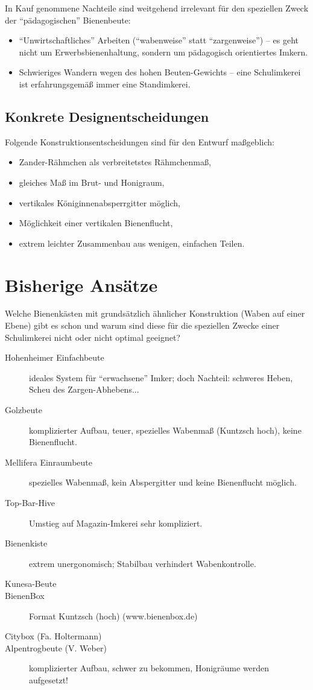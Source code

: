 \documentclass[12pt,a4paper,ngerman]{scrartcl}
\begin{document}
In Kauf genommene Nachteile sind weitgehend irrelevant für den speziellen Zweck der \enquote{pädagogischen} Bienenbeute:

\begin{itemize}
\item \enquote{Unwirtschaftliches} Arbeiten (\enquote{wabenweise} statt \enquote{zargenweise}) -- es geht nicht um Erwerbsbienenhaltung,
  sondern um pädagogisch orientiertes Imkern.
\item Schwieriges Wandern wegen des hohen Beuten-Gewichts -- eine Schulimkerei ist erfahrungsgemäß immer eine Standimkerei.
\end{itemize}


\subsection{Konkrete Designentscheidungen}

Folgende Konstruktionsentscheidungen sind für den Entwurf maßgeblich:

\begin{itemize}
\item Zander-Rähmchen als verbreitetstes Rähmchenmaß,
\item gleiches Maß im Brut- und Honigraum,
\item vertikales Königinnenabsperrgitter möglich,
\item Möglichkeit einer vertikalen Bienenflucht,
\item extrem leichter Zusammenbau aus wenigen, einfachen Teilen.
\end{itemize}


\section{Bisherige Ansätze}

Welche Bienenkästen mit grundsätzlich ähnlicher Konstruktion (Waben auf einer Ebene) gibt es schon und warum sind diese
für die speziellen Zwecke einer Schulimkerei nicht oder nicht optimal geeignet?

\begin{description}
\item[Hohenheimer Einfachbeute] ideales System für \enquote{erwachsene} Imker; doch Nachteil: schweres Heben, Scheu des Zargen-Abhebens...
\item[Golzbeute] komplizierter Aufbau, teuer, spezielles Wabenmaß (Kuntzsch hoch), keine Bienenflucht.
\item[Mellifera Einraumbeute] spezielles Wabenmaß, kein Abspergitter und keine Bienenflucht möglich.
\item[Top-Bar-Hive] Umstieg auf Magazin-Imkerei sehr kompliziert.
\item[Bienenkiste] extrem unergonomisch; Stabilbau verhindert Wabenkontrolle.
\item[Kunesa-Beute]
\item[BienenBox] Format Kuntzsch (hoch)  (www.bienenbox.de)
\item[Citybox (Fa. Holtermann)]
\item[Alpentrogbeute (V. Weber)] komplizierter Aufbau, schwer zu bekommen, Honigräume werden aufgesetzt!
\end{description}
\end{document}
